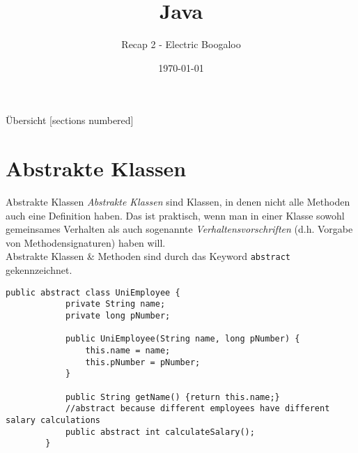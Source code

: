 

\usepackage{csquotes}
\usepackage{textcomp}



\date{\today}

\title{Java}
\subtitle{Recap 2 \tiny{- Electric Boogaloo}}

\begin{frame}
    \titlepage
\end{frame}

\begin{frame}{Übersicht}
    [sections numbered]
    \tableofcontents
\end{frame}

\section{Abstrakte Klassen}
\begin{frame}[fragile]{Abstrakte Klassen}
    \textit{Abstrakte Klassen} sind Klassen, in denen nicht alle Methoden auch eine Definition haben. Das ist praktisch, wenn man in einer Klasse sowohl
    gemeinsames Verhalten als auch sogenannte \textit{Verhaltensvorschriften} (d.h. Vorgabe von Methodensignaturen) haben will. \\
    Abstrakte Klassen \& Methoden sind durch das Keyword \texttt{abstract} gekennzeichnet.
    \begin{lstlisting}[basicstyle=\ttfamily\scriptsize,gobble=8]
        public abstract class UniEmployee {
            private String name;
            private long pNumber;

            public UniEmployee(String name, long pNumber) {
                this.name = name;
                this.pNumber = pNumber;
            }

            public String getName() {return this.name;}
            //abstract because different employees have different salary calculations
            public abstract int calculateSalary();
        }
    \end{lstlisting}
\end{frame}

